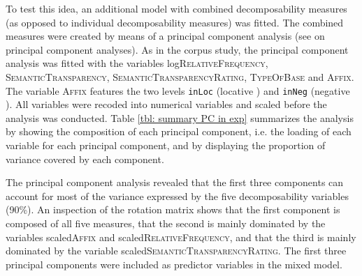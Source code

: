 To test this idea, an additional model with combined decomposability measures (as opposed to individual decomposability measures) was fitted. The combined measures were created by means of a principal component analysis (see  on principal component analyses). 
As in the corpus study, the principal component analysis was fitted with the variables log\textsc{RelativeFrequency}, \textsc{SemanticTransparency}, \textsc{SemanticTransparencyRating}, \textsc{TypeOfBase} and \textsc{Affix}. The variable \textsc{Affix} features the two levels \texttt{inLoc} (locative ) and \texttt{inNeg} (negative ). All variables were recoded into numerical variables and scaled before the analysis was conducted. 
Table \ref{tbl: summary PC in exp} summarizes the analysis by showing the composition of each principal component, i.e. the loading of each variable for each principal component, and by displaying the proportion of variance covered by each component. 










The principal component analysis revealed that the first three components can account for most of the variance expressed by the five decomposability variables (90\%). An inspection of the rotation matrix shows that the first component is composed of all five measures, that the second is mainly dominated by the variables scaled\textsc{Affix} and scaled\textsc{RelativeFrequency}, and that the third is mainly dominated by the variable scaled\textsc{SemanticTransparencyRating}. 
The first three principal components were included as predictor variables in the mixed model.  

\clearpage


